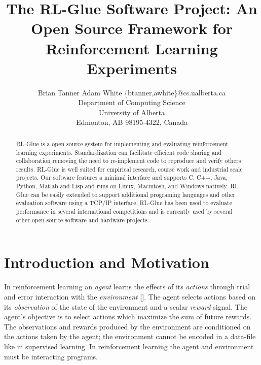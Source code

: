 \documentclass[twopage,11pt]{article}
\begin{document}
\title{The RL-Glue Software Project: An Open Source Framework for Reinforcement Learning Experiments}

\author{\name Brian Tanner \AND Adam White  \email \{btanner,awhite\}@cs.ualberta.ca \\
       \addr Department of Computing Science\\
       University of Alberta\\
       Edmonton, AB 98195-4322, Canada}


\maketitle

\begin{abstract}
RL-Glue is a open source system for implementing and evaluating reinforcement learning experiments. Standardization can facilitate efficient code sharing and collaboration removing the need to re-implement code to reproduce and verify others results.  RL-Glue is well suited for empirical research, course work and industrial scale projects. Our software features a minimal interface and supports C, C++, Java, Python, Matlab and Lisp and runs on Linux, Macintosh, and Windows natively. RL-Glue can be easily extended to support additional programing languages and other evaluation software using a TCP/IP interface. RL-Glue has been used to evaluate performance in several international competitions and is currently used by several other open-source software and hardware projects.
\end{abstract}

\section{Introduction and Motivation}
In reinforcement learning an {\it agent} learns the effects of its {\it actions} through trial and error interaction with the {\it environment} [\cite{rlbook, rlsurvey,ndp}]. The agent selects actions based on its {\it observation} of the state of the environment and a scalar {\it reward} signal. The agent's objective is to select actions which maximize the sum of future rewards. The observations and rewards produced by the environment are conditioned on the actions taken by the agent; the environment cannot be encoded in a data-file like in supervised learning. In reinforcement learning the agent and environment must be interacting programs. 
\end{document}

